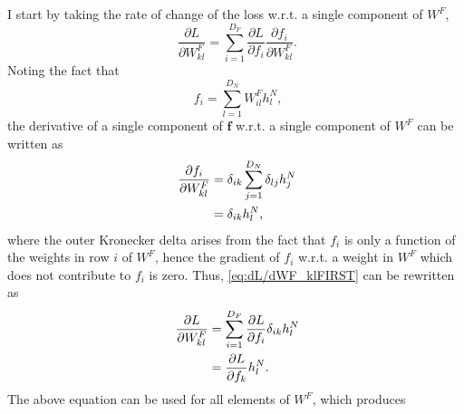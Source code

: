 \documentclass{article}
\begin{document}
I start by taking the rate of change of the loss w.r.t. a single component of $W^F$,
\begin{equation}
\label{eq:dL/dWF_klFIRST}
    \phantom{.}\frac{\partial L}{\partial W^F_{kl}} = \displaystyle\sum_{i=1}^{D_F}\frac{\partial L}{\partial f_i}\frac{\partial f_i}{\partial W^F_{kl}}.
\end{equation}
Noting the fact that
\begin{equation}
\label{eq:fiSUM}
    \phantom{,}f_i = \displaystyle\sum_{l=1}^{D_N}W^F_{il}h^N_l,
\end{equation}
the derivative of a single component of $\mathbf{f}$ w.r.t. a single component of $W^F$ can be written as
\begin{align}
    \phantom{,}\frac{\partial f_i}{\partial W^F_{kl}} &= \delta_{ik}\displaystyle\sum_{j=1}^{D_N}\delta_{lj}h^N_j\notag \\
    &= \delta_{ik}h^N_l,
\end{align}
where the outer Kronecker delta arises from the fact that $f_i$ is only a function of the weights in row $i$ of $W^F$, hence the gradient of $f_i$ w.r.t. a weight in $W^F$ which does not contribute to $f_i$ is zero. Thus, \cref{eq:dL/dWF_klFIRST} can be rewritten as
\begin{align}
    \phantom{.}\frac{\partial L}{\partial W^F_{kl}} &= \displaystyle\sum_{i=1}^{D_F}\frac{\partial L}{\partial f_i}\delta_{ik}h^N_l\notag \\
    &= \frac{\partial L}{\partial f_k}h^N_l.
\end{align}
The above equation can be used for all elements of $W^F$, which produces
\end{document}
